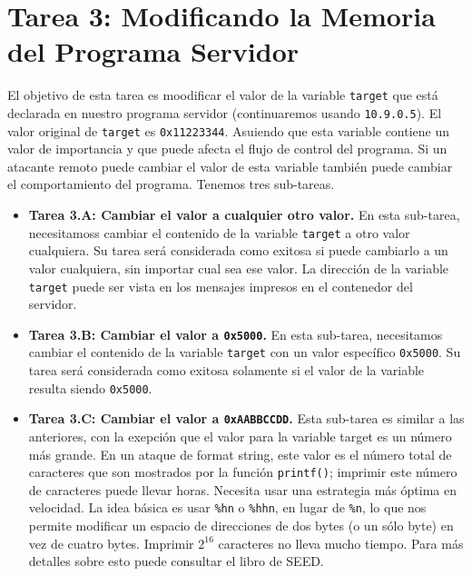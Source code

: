 \section{Tarea 3: Modificando la Memoria del Programa Servidor}

El objetivo de esta tarea es moodificar el valor de la variable \texttt{target} que está declarada en nuestro programa servidor (continuaremos usando \texttt{10.9.0.5}).
El valor original de \texttt{target} es \texttt{0x11223344}. 
Asuiendo que esta variable contiene un valor de importancia y que puede afecta el flujo de control del programa. Si un atacante remoto puede cambiar el valor de esta variable también puede cambiar el comportamiento del programa. Tenemos tres sub-tareas.

\begin{itemize} 
\item \textbf{Tarea 3.A: Cambiar el valor a cualquier otro valor.}
En esta sub-tarea, necesitamoss cambiar el contenido de la variable \texttt{target} a otro valor cualquiera. Su tarea será considerada como exitosa si puede cambiarlo a un valor cualquiera, sin importar cual sea ese valor. La dirección de la variable \texttt{target} puede ser vista en los mensajes impresos en el contenedor del servidor.


\item \textbf{Tarea 3.B: Cambiar el valor a \texttt{0x5000}.}  
En esta sub-tarea, necesitamos cambiar el contenido de la variable  \texttt{target} con un valor específico \texttt{0x5000}. Su tarea será considerada como exitosa solamente si el valor de la variable resulta siendo \texttt{0x5000}.


\item \textbf{Tarea 3.C: Cambiar el valor a \texttt{0xAABBCCDD}.}  
Esta sub-tarea es similar a las anteriores, con la exepción que el valor para la variable target es un número más grande. En un ataque de format string, este valor es el número total de caracteres que son mostrados por la función \texttt{printf()}; imprimir este número de caracteres puede llevar horas. Necesita usar una estrategia más óptima en velocidad.
La idea básica es usar  \texttt{\%hn} o \texttt{\%hhn}, en lugar de \texttt{\%n}, lo que nos permite modificar un espacio de direcciones de dos bytes (o un sólo byte) en vez de cuatro bytes. Imprimir $2^{16}$ caracteres no lleva mucho tiempo.
Para más detalles sobre esto puede consultar el libro de SEED.
\end{itemize} 



